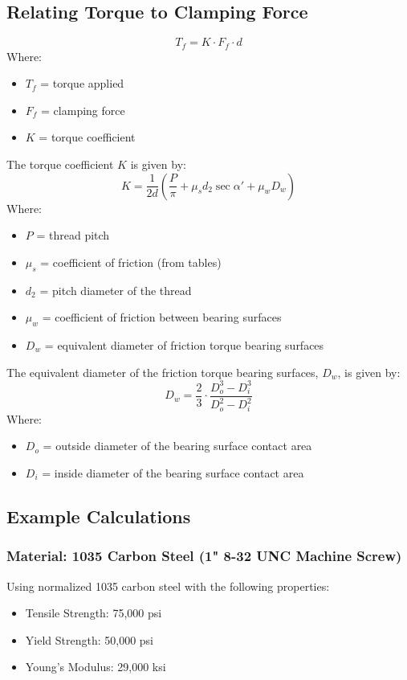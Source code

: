 \subsection*{Relating Torque to Clamping Force}
\[
T_f = K \cdot F_f \cdot d
\]
Where:
\begin{itemize}
    \item $T_f$ = torque applied
    \item $F_f$ = clamping force
    \item $K$ = torque coefficient
\end{itemize}

The torque coefficient $K$ is given by:
\[
K = \frac{1}{2d} \left( \frac{P}{\pi} + \mu_s d_2 \sec \alpha' + \mu_w D_w \right)
\]
Where:
\begin{itemize}
    \item $P$ = thread pitch
    \item $\mu_s$ = coefficient of friction (from tables)
    \item $d_2$ = pitch diameter of the thread
    \item $\mu_w$ = coefficient of friction between bearing surfaces
    \item $D_w$ = equivalent diameter of friction torque bearing surfaces
\end{itemize}

The equivalent diameter of the friction torque bearing surfaces, $D_w$, is given by:
\[
D_w = \frac{2}{3} \cdot \frac{D_o^3 - D_i^3}{D_o^2 - D_i^2}
\]
Where:
\begin{itemize}
    \item $D_o$ = outside diameter of the bearing surface contact area
    \item $D_i$ = inside diameter of the bearing surface contact area
\end{itemize}

\subsection*{Example Calculations}

\subsubsection*{Material: 1035 Carbon Steel (1" 8-32 UNC Machine Screw)}
Using normalized 1035 carbon steel with the following properties:
\begin{itemize}
    \item Tensile Strength: 75,000 psi
    \item Yield Strength: 50,000 psi
    \item Young’s Modulus: 29,000 ksi
\end{itemize}

